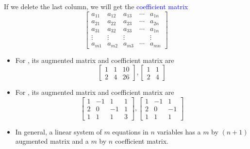 \documentclass{beamer}
\theoremstyle{definition}
\theoremstyle{remark}
\begin{document}
\begin{frame}[t]
\begin{definition}
If we delete the last column, we will get the \textcolor{blue}{coefficient matrix}
\[
\begin{bmatrix}
a_{11}&a_{12}&a_{13}&\cdots&a_{1n}\\
a_{21}&a_{22}&a_{23}&\cdots&a_{2n}\\
a_{31}&a_{32}&a_{33}&\cdots&a_{1n}\\
\vdots&\vdots&\vdots&&\vdots\\
a_{m1}&a_{m2}&a_{m3}&\cdots&a_{mn}
\end{bmatrix}
\]
\end{definition}
\end{frame}

\begin{frame}[t]
\begin{example}\hfill
\begin{itemize}
\item For , its augmented matrix and coefficient matrix are
\[
\begin{bmatrix}
1&1&10\\
2&4&26
\end{bmatrix},\begin{bmatrix}
1&1\\
2&4
\end{bmatrix}
\]
\pause
\item For , its augmented matrix and coefficient matrix are
\[
\begin{bmatrix}
1&-1&1&1\\
2&0&-1&1\\
1&1&1&3
\end{bmatrix},\begin{bmatrix}
1&-1&1\\
2&0&-1\\
1&1&1
\end{bmatrix}
\]
\pause
\item In general, a linear system of $m$ equations in $n$ variables has a $m$ by $(n+1)$ augmented matrix and a $m$ by $n$ coefficient matrix.
\end{itemize}
\end{example}
\end{frame}
\end{document}
